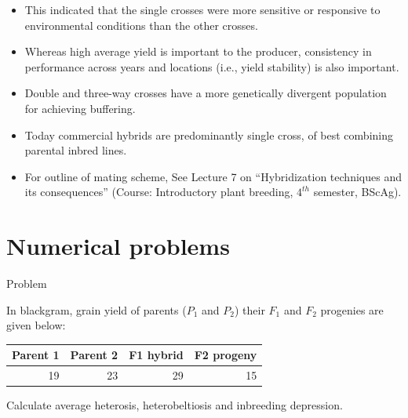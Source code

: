 \documentclass[11pt,dvipsnames,ignorenonframetext,aspectratio=169]{beamer}
\providecommand{\tightlist}{%
  \setlength{\itemsep}{0pt}\setlength{\parskip}{0pt}}
\begin{document}
\begin{frame}{}
\protect\hypertarget{section-14}{}

\begin{itemize}
\tightlist
\item
  This indicated that the single crosses were more sensitive or
  responsive to environmental conditions than the other crosses.
\item
  Whereas high average yield is important to the producer, consistency
  in performance across years and locations (i.e., yield stability) is
  also important.
\item
  Double and three-way crosses have a more genetically divergent
  population for achieving buffering.
\item
  Today commercial hybrids are predominantly single cross, of best
  combining parental inbred lines.
\item
  For outline of mating scheme, See Lecture 7 on ``Hybridization
  techniques and its consequences'' (Course: Introductory plant
  breeding, \(4^{th}\) semester, BScAg).
\end{itemize}

\end{frame}

\hypertarget{numerical-problems}{%
\section{Numerical problems}\label{numerical-problems}}

\begin{frame}{Problem}
\protect\hypertarget{problem-1}{}

In blackgram, grain yield of parents (\(P_1\) and \(P_2\)) their \(F_1\)
and \(F_2\) progenies are given below:

\begin{table}[H]
\centering\begingroup\fontsize{6}{8}\selectfont

\begin{tabular}{rrrr}
\toprule
Parent 1 & Parent 2 & F1 hybrid & F2 progeny\\
\midrule
19 & 23 & 29 & 15\\
\bottomrule
\end{tabular}
\endgroup{}
\end{table}

Calculate average heterosis, heterobeltiosis and inbreeding depression.

\end{frame}
\end{document}
